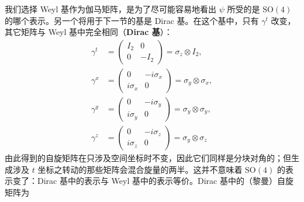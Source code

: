 我们选择 Weyl 基作为伽马矩阵，是为了尽可能容易地看出 $\psi$ 所受的是 $\mathrm{SO}(4)$ 的哪个表示。另一个将用于下一节的基是 Dirac 基。在这个基中，只有 $\gamma^{t}$ 改变，其它矩阵与 Weyl 基中完全相同（\textbf{Dirac 基}）：
\begin{align}
\gamma^{t} &=
\begin{pmatrix}I_{2}&0\\ 0&-I_{2}\end{pmatrix}
=\sigma_{z}\otimes I_{2}, \nonumber\\
\gamma^{x} &=
\begin{pmatrix}0&-i\sigma_{x}\\ i\sigma_{x}&0\end{pmatrix}
=\sigma_{y}\otimes\sigma_{x}, \nonumber\\
\gamma^{y} &=
\begin{pmatrix}0&-i\sigma_{y}\\ i\sigma_{y}&0\end{pmatrix}
=\sigma_{y}\otimes\sigma_{y}, \nonumber\\
\gamma^{z} &=
\begin{pmatrix}0&-i\sigma_{z}\\ i\sigma_{z}&0\end{pmatrix}
=\sigma_{y}\otimes\sigma_{z}
\tag{Riemannian}
\end{align}
由此得到的自旋矩阵在只涉及空间坐标时不变，因此它们同样是分块对角的；但生成涉及 $t$ 坐标之转动的那些矩阵会混合旋量的两半。这并不意味着 $\mathrm{SO}(4)$ 的表示变了：Dirac 基中的表示与 Weyl 基中的表示等价。Dirac 基中的（黎曼）自旋矩阵为
